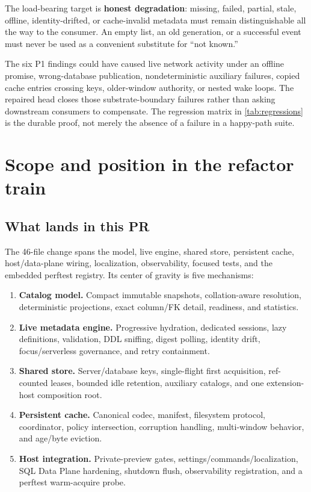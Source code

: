 \documentclass[11pt]{article}
\begin{document}
\begin{designbox}
The load-bearing target is \textbf{honest degradation}: missing, failed, partial, stale, offline, identity-drifted, or cache-invalid metadata must remain distinguishable all the way to the consumer. An empty list, an old generation, or a successful event must never be used as a convenient substitute for ``not known.''
\end{designbox}

\clearpage
\begin{reviewbox}[title={Why the repairs were required}]
The six P1 findings could have caused live network activity under an offline promise, wrong-database publication, nondeterministic auxiliary failures, copied cache entries crossing keys, older-window authority, or nested wake loops. The repaired head closes those substrate-boundary failures rather than asking downstream consumers to compensate. The regression matrix in \cref{tab:regressions} is the durable proof, not merely the absence of a failure in a happy-path suite.
\end{reviewbox}

\section{Scope and position in the refactor train}

\subsection{What lands in this PR}

The 46-file change spans the model, live engine, shared store, persistent cache, host/data-plane wiring, localization, observability, focused tests, and the embedded perftest registry. Its center of gravity is five mechanisms:

\begin{enumerate}
  \item \textbf{Catalog model.} Compact immutable snapshots, collation-aware resolution, deterministic projections, exact column/FK detail, readiness, and statistics.
  \item \textbf{Live metadata engine.} Progressive hydration, dedicated sessions, lazy definitions, validation, DDL sniffing, digest polling, identity drift, focus/serverless governance, and retry containment.
  \item \textbf{Shared store.} Server/database keys, single-flight first acquisition, ref-counted leases, bounded idle retention, auxiliary catalogs, and one extension-host composition root.
  \item \textbf{Persistent cache.} Canonical codec, manifest, filesystem protocol, coordinator, policy intersection, corruption handling, multi-window behavior, and age/byte eviction.
  \item \textbf{Host integration.} Private-preview gates, settings/commands/localization, SQL Data Plane hardening, shutdown flush, observability registration, and a perftest warm-acquire probe.
\end{enumerate}
\end{document}
